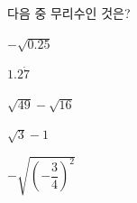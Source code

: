 다음 중 무리수인 것은?
\begin{choices32}{\rule[-3ex]{0pt}{8ex}$-\sqrt{0.25}$}{\rule[-3ex]{0pt}{8ex}$1.2\dot{7}$}{\rule[-3ex]{0pt}{8ex}$\sqrt{49}-\sqrt{16}$}{\rule[-3ex]{0pt}{8ex}$\sqrt{3}-1$}{\rule[-3ex]{0pt}{8ex}$-\sqrt{\left(-\dfrac{3}{4}\right)^2}$}\end{choices32}
